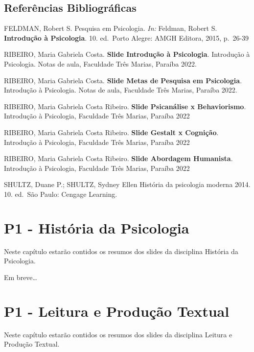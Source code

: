 \documentclass[
]{book}
\begin{document}
\hypertarget{referuxeancias-bibliogruxe1ficas-1}{%
\section{Referências Bibliográficas}\label{referuxeancias-bibliogruxe1ficas-1}}

FELDMAN, Robert S. Pesquisa em Psicologia. \emph{In:} Feldman, Robert S. \textbf{Introdução à Psicologia}. 10. ed.~Porto Alegre: AMGH Editora, 2015, p.~26-39

RIBEIRO, Maria Gabriela Costa. \textbf{Slide Introdução à Psicologia}. Introdução à Psicologia. Notas de aula, Faculdade Três Marias, Paraíba 2022.

RIBEIRO, Maria Gabriela Costa. \textbf{Slide Metas de Pesquisa em Psicologia}. Introdução à Psicologia. Notas de aula, Faculdade Três Marias, Paraíba 2022.

RIBEIRO, Maria Gabriela Costa Ribeiro. \textbf{Slide Psicanálise x Behaviorismo}. Introdução à Psicologia, Faculdade Três Marias, Paraíba 2022

RIBEIRO, Maria Gabriela Costa Ribeiro. \textbf{Slide Gestalt x Cognição}. Introdução à Psicologia, Faculdade Três Marias, Paraíba 2022

RIBEIRO, Maria Gabriela Costa Ribeiro. \textbf{Slide Abordagem Humanista}. Introdução à Psicologia, Faculdade Três Marias, Paraíba 2022

SHULTZ, Duane P.; SHULTZ, Sydney Ellen História da psicologia moderna 2014. 10. ed.~São Paulo: Cengage Learning.

\hypertarget{p1---histuxf3ria-da-psicologia}{%
\chapter{P1 - História da Psicologia}\label{p1---histuxf3ria-da-psicologia}}

Neste capítulo estarão contidos os resumos dos slides da disciplina História da Psicologia.

Em breve\ldots{}

\hypertarget{p1---leitura-e-produuxe7uxe3o-textual}{%
\chapter{P1 - Leitura e Produção Textual}\label{p1---leitura-e-produuxe7uxe3o-textual}}

Neste capítulo estarão contidos os resumos dos slides da disciplina Leitura e Produção Textual.
\end{document}
